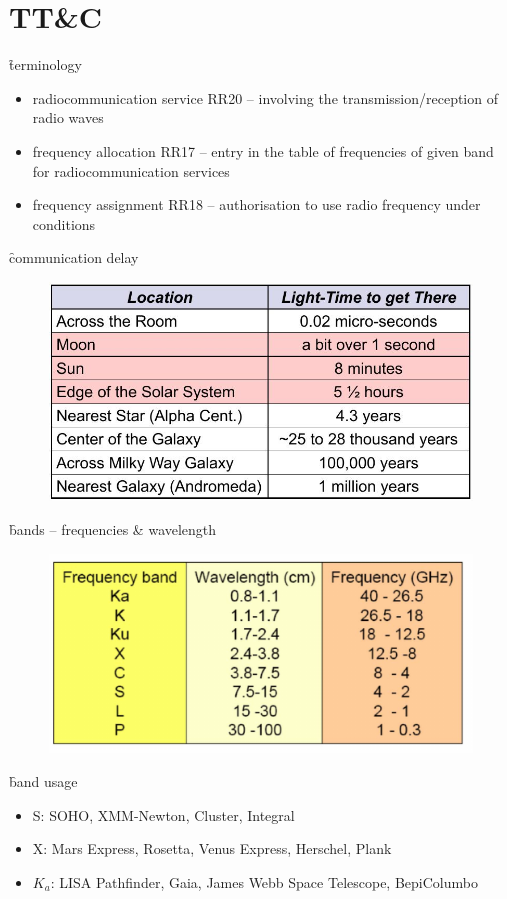 \section{TT\&C}
\f{terminology}
\begin{itemize}
 \item radiocommunication service RR20 -- involving the transmission/reception of radio waves
 \item frequency allocation RR17 -- entry in the table of frequencies of given band for radiocommunication services
 \item frequency assignment RR18 -- authorisation to use radio frequency under conditions
\end{itemize}

\f{communication delay}
\begin{figure}[ht!]
 \centering
 \includegraphics[scale=0.6]{commdelay}
\end{figure}

\f{bands -- frequencies \& wavelength}
\begin{figure}[ht!]
 \centering
 \includegraphics[scale=0.6]{bands}
\end{figure}

\f{band usage}
\begin{itemize}
 \item S: SOHO, XMM-Newton, Cluster, Integral
 \item X: Mars Express, Rosetta, Venus Express, Herschel, Plank
 \item $K_a$: LISA Pathfinder, Gaia, James Webb Space Telescope, BepiColumbo
\end{itemize}


